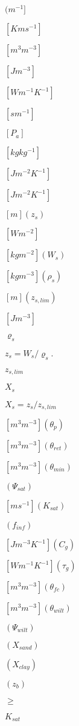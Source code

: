 \documentclass{article}
\begin{document}
$(m^{-1} ]$
\pagebreak

$[K m s^{-1} ]$
\pagebreak

$[m^3 m^{-3} ]$
\pagebreak

$[J m^{-3} ]$
\pagebreak

$[W m^{-1} K^{-1} ]$
\pagebreak

$[s m^{-1} ]$
\pagebreak

$[P_a]$
\pagebreak

$[kg kg^{-1}]$
\pagebreak

$ [J m^{-2} K^{-1}]$
\pagebreak

$[J m^{-2} K^{-1}]$
\pagebreak

$[m] (z_s)$
\pagebreak

$[W m^{-2}]$
\pagebreak

$[kg m^{-2}] (W_s)$
\pagebreak

$[kg m^{-3}] (\rho_s)$
\pagebreak

$[m] (z_{s,lim})$
\pagebreak

$[J m^{-3}]$
\pagebreak

$\varrho_s$
\pagebreak

$ z_s = W_s / \varrho_s. $
\pagebreak

$z_{s,lim}$
\pagebreak

$X_s$
\pagebreak

$ X_s = z_s / z_{s,lim} $
\pagebreak

$[m^3 m^{-3} ] ( \theta_p )$
\pagebreak

$[m^3 m^{-3} ] (\theta_{ret} )$
\pagebreak

$[m^3 m^{-3} ] (\theta_{min} )$
\pagebreak

$(\Psi_{sat} )$
\pagebreak

$[m s^{-1} ] (K_{sat} )$
\pagebreak

$(f_{inf} )$
\pagebreak

$[J m^{-3} K^{-1} ] (C_g )$
\pagebreak

$[W m^{-1} K^{-1} ] (\tau_g )$
\pagebreak

$[m^3 m^{-3} ] (\theta_{fc} )$
\pagebreak

$[m^3 m^{-3} ] (\theta_{wilt})$
\pagebreak

$(\Psi_{wilt} )$
\pagebreak

$(X_{sand} )$
\pagebreak

$(X_{clay} )$
\pagebreak

$(z_b )$
\pagebreak

$\geq$
\pagebreak

$K_{sat}$
\pagebreak
\end{document}
